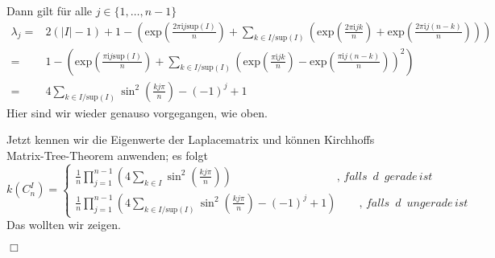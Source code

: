 Dann gilt für alle $j \in \{1,\ldots,n-1\}$
\small
\begin{equation}
\begin{aligned}
 \lambda_j = {} & { 2(|I|-1)+1 - \left(\mathrm{exp}{\left(\frac{2\pi \mathrm{i}j \mathrm{sup}(I)}{n}\right)}+ \sum_{k\in I/\mathrm{sup}(I)}\left(\mathrm{exp}{\left(\frac{2\pi \mathrm{i}jk}{n}\right)}+ \mathrm{exp}{\left(\frac{2\pi \mathrm{i}j(n-k)}{n}\right)}\right)\right)}\\
  = {} &1-\left(\mathrm{exp}{\left(\frac{\pi \mathrm{i}j \mathrm{sup}(I)}{n}\right)} +\sum_{k\in I/\mathrm{sup}(I)}\left(\mathrm{exp}{\left(\frac{\pi \mathrm{i}jk}{n}\right)} - \mathrm{exp}{\left(\frac{\pi \mathrm{i}j(n-k)}{n}\right)}\right)^2\right)\\
  = {} & 4\sum_{k\in I/\mathrm{sup}(I)} \sin^2 \left( \frac{kj\pi}{n}\right)-(-1)^j+1
 \end{aligned}
\end{equation}
\normalsize
Hier sind wir wieder genauso vorgegangen, wie oben.\\
\par
\endgroup
Jetzt kennen wir die Eigenwerte der Laplacematrix und können Kirchhoffs Matrix-Tree-Theorem anwenden; es folgt
\begin{equation}
\mathit{k}\left( C_n^I \right) = 
 \begin{cases}
\frac{1}{n} \prod_{j=1}^{n-1} \left(4 \sum_{k \in I} \sin^2 \left( \frac{kj\pi}{n}\right) \right)\qquad\qquad\qquad\qquad\quad\; ,\,falls\,\,\,d\,\,\,gerade\,ist\\
\frac{1}{n} \prod_{j=1}^{n-1} \left(4 \sum_{k \in I/\mathrm{sup}(I)} \sin^2 \left( \frac{kj\pi}{n}\right)-(-1)^j+1\right)\qquad,\,falls\,\,\,d\,\,\,ungerade\,ist
\end{cases}
\end{equation}
Das wollten wir zeigen.
\begin{flushright} $\Box$ \end{flushright} 
\begin{Bsps}
\end{Bsps} 
